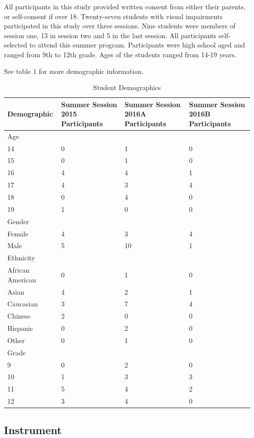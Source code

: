 \documentclass[11.5pt]{sig-alternate} %
\begin{document}
\begin{large}
All participants in this study provided written consent from either their parents, or self-consent if over 18. Twenty-seven students with visual impairments participated in this study over three sessions. Nine students were members of session one, 13 in session two and 5 in the last session. All participants self-selected to attend this summer program. Participants were high school aged and ranged from 9th to 12th grade. Ages of the students ranged from 14-19 years.   

See table 1 for more demographic information.

\begin{table}[t]
\caption{Student Demographics}
\begin{tabular}{p{2in}p{2.5in}p{2.5in}p{2.5in}}
Demographic & Summer Session 2015 Participants & Summer Session 2016A Participants & Summer Session 2016B Participants \\ \hline
Age & & & \\
14 & 0 & 1 & 0 \\
15 & 0 & 1 & 0 \\
16 & 4 & 4 & 1 \\
17 & 4 & 3 & 4 \\
18 & 0 & 4 & 0 \\
19 & 1 & 0 & 0 \\
Gender & & & \\
Female & 4 & 3 & 4 \\
Male & 5 & 10 & 1 \\
Ethnicity & & & \\
African American & 0 & 1 & 0 \\
Asian & 4 & 2 & 1 \\
Caucasian & 3 & 7 & 4 \\
Chinese & 2 & 0 & 0 \\
Hispanic & 0 & 2 & 0 \\
Other & 0 & 1 & 0 \\
Grade & & & \\
9 & 0 & 2 & 0 \\
10 & 1 & 3 & 3 \\
11 & 5 & 4 & 2 \\
12 & 3 & 4 & 0 \\
\end{tabular}
\end{table}

\subsection*{Instrument}


\end{large}
\end{document}
